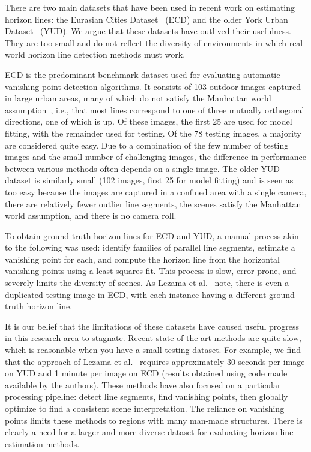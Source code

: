 \documentclass{bmvc2k}
\makeatletter
\newcommand*{\ie}{i.e.\@\xspace}
\makeatother
\begin{document}
There are two main datasets that have been used in recent work on
estimating horizon lines: the Eurasian Cities
Dataset~\cite{barinova2010geometric} (ECD) and the older York Urban
Dataset~\cite{denis2008efficient} (YUD). We argue that these datasets
have outlived their usefulness. They are too small and do
not reflect the diversity of environments in which real-world
horizon line detection methods must work.

ECD is the predominant benchmark dataset used for evaluating automatic
vanishing point detection algorithms. It consists of 103 outdoor
images captured in large urban areas, many of which do not satisfy the
Manhattan world assumption~\cite{coughlan1999manhattan}, \ie, that
most lines correspond to one of three mutually orthogonal directions,
one of which is up. Of these images, the first 25 are used for model
fitting, with the remainder used for testing. Of the 78 testing
images, a majority are considered quite easy. Due to a combination of
the few number of testing images and the small number of
challenging images, the difference in performance between various
methods often depends on a single image.
The older YUD dataset is similarly small (102 images, first 25 for
model fitting) and is seen as too easy because the images are captured in a
confined area with a single camera, there are relatively fewer outlier
line segments, the scenes satisfy the Manhattan world assumption, and
there is no camera roll.  

To obtain ground truth horizon lines for ECD and YUD, a manual process
akin to the following was used: identify families of parallel line
segments, estimate a vanishing point for each, and compute the horizon
line from the horizontal vanishing points using a least squares fit.
This process is slow, error prone, and severely limits the diversity
of scenes. As Lezama et al.~\cite{lezama2014finding} note, there is
even a duplicated testing image in ECD, with each instance having a
different ground truth horizon line. 

It is our belief that the limitations of these datasets have caused
useful progress in this research area to stagnate. Recent 
state-of-the-art methods are quite slow, which is reasonable when you
have a small testing dataset.  For example, we find that the
approach of Lezama et al.~\cite{lezama2014finding} requires
approximately 30 seconds per image on YUD and 1 minute per image on
ECD (results obtained using code made available by the authors). These
methods have also focused on a particular processing pipeline: detect
line segments, find vanishing points, then globally optimize to find a
consistent scene interpretation. The reliance on vanishing points
limits these methods to regions with many man-made structures. There
is clearly a need for a larger and more diverse dataset for evaluating
horizon line estimation methods.
\end{document}
